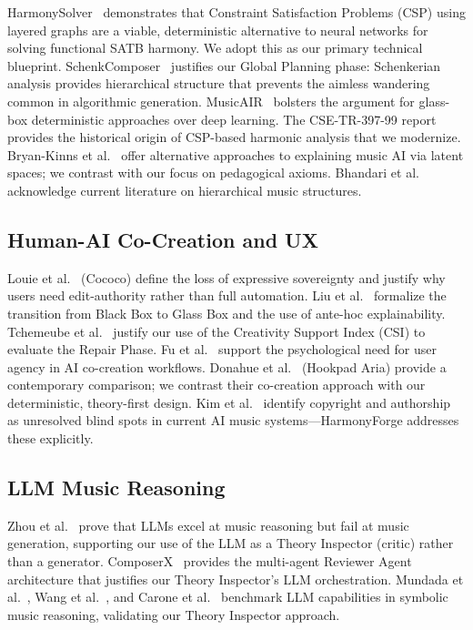 HarmonySolver~\cite{dajda2020} demonstrates that Constraint Satisfaction Problems (CSP) using layered graphs are a viable, deterministic alternative to neural networks for solving functional SATB harmony. We adopt this as our primary technical blueprint. SchenkComposer~\cite{hahn2023} justifies our Global Planning phase: Schenkerian analysis provides hierarchical structure that prevents the aimless wandering common in algorithmic generation. MusicAIR~\cite{liao2025} bolsters the argument for glass-box deterministic approaches over deep learning. The CSE-TR-397-99 report~\cite{csetr397} provides the historical origin of CSP-based harmonic analysis that we modernize. Bryan-Kinns et al.~\cite{bryan2023} offer alternative approaches to explaining music AI via latent spaces; we contrast with our focus on pedagogical axioms. Bhandari et al.~\cite{bhandari2024} acknowledge current literature on hierarchical music structures.

\subsection{Human-AI Co-Creation and UX}

Louie et al.~\cite{louie2020} (Cococo) define the loss of expressive sovereignty and justify why users need edit-authority rather than full automation. Liu et al.~\cite{liu2025} formalize the transition from Black Box to Glass Box and the use of ante-hoc explainability. Tchemeube et al.~\cite{tchemeube2025} justify our use of the Creativity Support Index (CSI) to evaluate the Repair Phase. Fu et al.~\cite{fu2025exploring} support the psychological need for user agency in AI co-creation workflows. Donahue et al.~\cite{donahue2025} (Hookpad Aria) provide a contemporary comparison; we contrast their co-creation approach with our deterministic, theory-first design. Kim et al.~\cite{kim2026} identify copyright and authorship as unresolved blind spots in current AI music systems---HarmonyForge addresses these explicitly.

\subsection{LLM Music Reasoning}

Zhou et al.~\cite{zhou2024} prove that LLMs excel at music reasoning but fail at music generation, supporting our use of the LLM as a Theory Inspector (critic) rather than a generator. ComposerX~\cite{deng2024} provides the multi-agent Reviewer Agent architecture that justifies our Theory Inspector's LLM orchestration. Mundada et al.~\cite{mundada2025}, Wang et al.~\cite{wang2025symbolic}, and Carone et al.~\cite{carone2026} benchmark LLM capabilities in symbolic music reasoning, validating our Theory Inspector approach.

